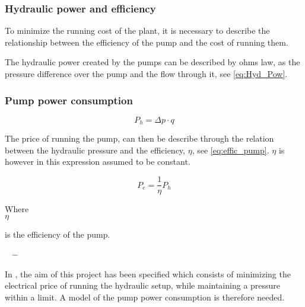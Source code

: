 \subsubsection*{Hydraulic power and efficiency}
To minimize the running cost of the plant, it is necessary to describe the relationship between the efficiency of the pump and the cost of running them.

The hydraulic power created by the pumps can be described by ohms law, as the pressure difference over the pump and the flow through it, see \eqref{eq:Hyd_Pow}.

\subsubsection*{Pump power consumption}
\begin{equation}
P_h = \Delta p \cdot q 
\label{eq:Hyd_Pow}
\end{equation}

The price of running the pump, can then be describe through the relation between the hydraulic pressure and the efficiency, $\eta$, see \eqref{eq:effic_pump}. $\eta$ is however in this expression assumed to be constant.  

\begin{equation}
P_e = \frac{1}{\eta}P_h
\label{eq:effic_pump}
\end{equation}

\begin{minipage}[t]{0.20\textwidth}
Where\\
\hspace*{8mm} $\eta$

\end{minipage}
\begin{minipage}[t]{0.68\textwidth}
\vspace*{2mm}
is the efficiency of the pump.
\end{minipage}
\begin{minipage}[t]{0.10\textwidth}
\vspace*{2mm}
\textcolor{White}{te}$\unit{-}$\\
\end{minipage}	




In , the aim of this project has been specified which consists of minimizing the electrical price of running the hydraulic setup, while maintaining a pressure within a limit. 
A model of the pump power consumption is therefore needed.

